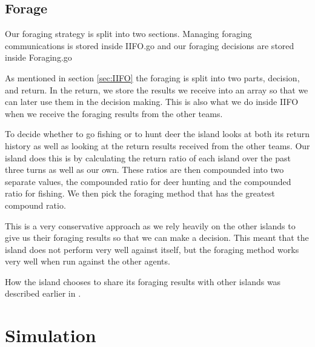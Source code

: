 \subsection{Forage}
Our foraging strategy is split into two sections. Managing foraging communications is stored inside IIFO.go and our foraging decisions are stored inside Foraging.go

As mentioned in section \ref{sec:IIFO} %
the foraging is split into two parts, decision, and return. In the return, we store the results we receive into an array so that we can later use them in the decision making. This is also what we do inside IIFO when we receive the foraging results from the other teams. 

To decide whether to go fishing or to hunt deer the island looks at both its return history as well as looking at the return results received from the other teams. Our island does this is by calculating the return ratio of each island over the past three turns as well as our own. These ratios are then compounded into two separate values, the compounded ratio for deer hunting and the compounded ratio for fishing.  We then pick the foraging method that has the greatest compound ratio. 

This is a very conservative approach as we rely heavily on the other islands to give us their foraging results so that we can make a decision. This meant that the island does not perform very well against itself, but the foraging method works very well when run against the other agents.

How the island chooses to share its foraging results with other islands was described earlier in \label{sec:team4:iigo}. 


\section{Simulation}



